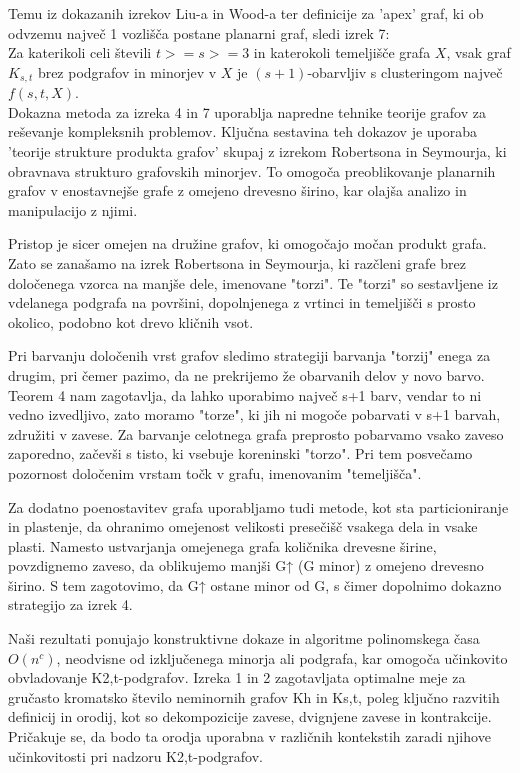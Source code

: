 \documentclass{article}
\begin{document}
Temu iz dokazanih izrekov Liu-a in Wood-a ter definicije za 'apex' graf, ki ob odvzemu največ 1 vozlišča postane planarni graf, sledi izrek 7:\\
Za katerikoli celi števili $t >= s >= 3$ in katerokoli temeljišče grafa $X$, vsak graf $K_{s,t}$ brez podgrafov in minorjev v $X$ je $(s + 1)$-obarvljiv s clusteringom največ $f(s, t, X)$.\\

Dokazna metoda za izreka 4 in 7 uporablja napredne tehnike teorije grafov za reševanje kompleksnih problemov. Ključna sestavina teh dokazov je uporaba 'teorije strukture produkta grafov' skupaj z izrekom Robertsona in Seymourja, ki obravnava strukturo grafovskih minorjev. To omogoča preoblikovanje planarnih grafov v enostavnejše grafe z omejeno drevesno širino, kar olajša analizo in manipulacijo z njimi.

Pristop je sicer omejen na družine grafov, ki omogočajo močan produkt grafa. Zato se zanašamo na izrek Robertsona in Seymourja, ki razčleni grafe brez določenega vzorca na manjše dele, imenovane "torzi". Te "torzi" so sestavljene iz vdelanega podgrafa na površini, dopolnjenega z vrtinci in temeljišči s prosto okolico, podobno kot drevo kličnih vsot.

Pri barvanju določenih vrst grafov sledimo strategiji barvanja "torzij" enega za drugim, pri čemer pazimo, da ne prekrijemo že obarvanih delov y novo barvo. Teorem 4 nam zagotavlja, da lahko uporabimo največ s+1 barv, vendar to ni vedno izvedljivo, zato moramo "torze", ki jih ni mogoče pobarvati v s+1 barvah, združiti v zavese. Za barvanje celotnega grafa preprosto pobarvamo vsako zaveso zaporedno, začevši s tisto, ki vsebuje koreninski "torzo". Pri tem posvečamo pozornost določenim vrstam točk v grafu, imenovanim "temeljišča".

Za dodatno poenostavitev grafa uporabljamo tudi metode, kot sta particioniranje in plastenje, da ohranimo omejenost velikosti presečišč vsakega dela in vsake plasti. Namesto ustvarjanja omejenega grafa količnika drevesne širine, povzdignemo zaveso, da oblikujemo manjši G↑ (G minor) z omejeno drevesno širino. S tem zagotovimo, da G↑ ostane minor od G, s čimer dopolnimo dokazno strategijo za izrek 4.

Naši rezultati ponujajo konstruktivne dokaze in algoritme polinomskega časa $O(n^c)$, neodvisne od izključenega minorja ali podgrafa, kar omogoča učinkovito obvladovanje K2,t-podgrafov. Izreka 1 in 2 zagotavljata optimalne meje za gručasto kromatsko število neminornih grafov Kh in Ks,t, poleg ključno razvitih definicij in orodij, kot so dekompozicije zavese, dvignjene zavese in kontrakcije. Pričakuje se, da bodo ta orodja uporabna v različnih kontekstih zaradi njihove učinkovitosti pri nadzoru K2,t-podgrafov.
\end{document}
